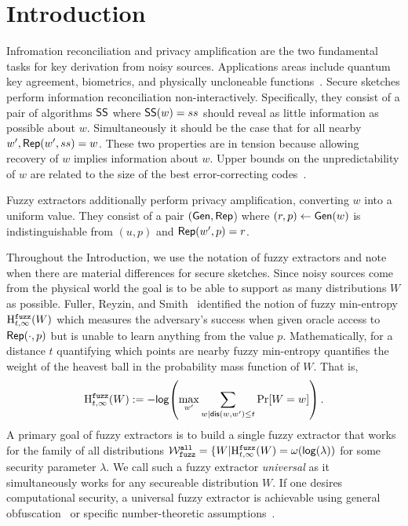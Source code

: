 
\section{Introduction}
Infromation reconciliation and privacy amplification are the two fundamental tasks for key derivation from noisy sources.  Applications areas include quantum key agreement, biometrics, and physically uncloneable functions~\cite{bennett1988privacy,dodis2008fuzzy}. Secure sketches perform information reconciliation non-interactively.  Specifically, they consist of a pair of algorithms ${\mathsf{SS}}$ where ${\mathsf{SS}}(w) = ss$ should reveal as little information as possible about $w$.  Simultaneously it should be the case that for all nearby $w', {\mathsf{Rep}}(w', ss) = w$.  These two properties are in tension because allowing recovery of $w$ implies information about $w$.  Upper bounds on the unpredictability of $w$ are related to the size of the best error-correcting codes~\cite{dodis2008fuzzy,fuller2020computational}. 

  Fuzzy extractors additionally perform privacy amplification, converting $w$ into a uniform value.  They consist of a pair $({\mathsf{Gen}}, {\mathsf{Rep}}$) where $(r, p)\leftarrow {\ensuremath{\mathsf{Gen}}}(w)$ is indistinguishable from $(u, p)$ and ${\mathsf{Rep}}(w', p) =r$.

Throughout the Introduction, we use the notation of fuzzy extractors and note when there are material differences for secure sketches.
Since noisy sources come from the physical world the goal is to be able to support as many distributions $W$ as possible.  Fuller, Reyzin, and Smith~\cite{fuller2016fuzzy,fuller2020fuzzy} identified the notion of fuzzy min-entropy $\mathrm{H}^{\mathtt{fuzz}}_{t,\infty}(W)$ which measures the adversary's success when given oracle access to ${\mathsf{Rep}}(\cdot, p)$ but is unable to learn anything from the value  $p$.  Mathematically, for a distance $t$ quantifying which points are nearby fuzzy min-entropy quantifies the weight of the heavest ball in the probability mass function of $W$.  That is, 
\[
\mathrm{H}^{\mathtt{fuzz}}_{t,\infty}(W):= -\mathsf{log}\!\left(\max_{w'} \sum_{w | \mathsf{dis}(w, w')\le t} \Pr[W=w]\right).
\]A primary goal of fuzzy extractors is to build a single fuzzy extractor that works for the family of all distributions $\mathcal{W}_{\mathtt{fuzz}}^{\mathtt{all}} = \{ W | \mathrm{H}^{\mathtt{fuzz}}_{t,\infty}(W) = \omega(\mathsf{log}\!\left(\lambda\right))$ for some security parameter $\lambda$.  We call such a fuzzy extractor \emph{universal} as it simultaneously works for any secureable distribution $W$. 
If one desires computational security, a universal fuzzy extractor is achievable using general obfuscation~\cite{BarakBCKPS13,BitanskyCKP14,bitansky2017virtual} or specific number-theoretic assumptions~\cite{galbraith2019obfuscated}. 


